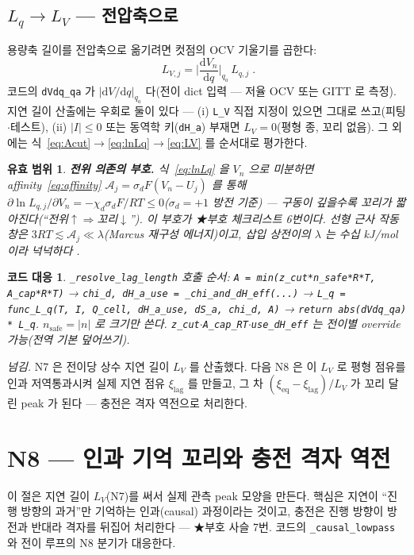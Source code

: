 \documentclass[11pt,a4paper]{article}
\newtheorem*{codebox}{코드 대응}
\newtheorem*{boundbox}{유효 범위}
\newcommand{\dd}{\mathrm{d}}
\newcommand{\eq}{\mathrm{eq}}
\newcommand{\lag}{\mathrm{lag}}
\newcommand{\code}[1]{\texttt{#1}}
\begin{document}
\subsection{$L_q\to L_V$ — 전압축으로}
용량축 길이를 전압축으로 옮기려면 컷점의 OCV 기울기를 곱한다:
\begin{equation}
\boxed{\;L_{V,j}=\Big|\frac{\dd V_n}{\dd q}\Big|_{q_a}\,L_{q,j}\;.}
\label{eq:LV}
\end{equation}
코드의 \code{dVdq\_qa} 가 $|\dd V/\dd q|_{q_a}$ 다(전이 dict 입력 — 저율 OCV 또는 GITT \cite{weppner1977} 로 측정). 지연 길이 산출에는 우회로 둘이 있다 — (i) \code{L\_V} 직접 지정이 있으면 그대로 쓰고(피팅$\cdot$테스트), (ii) $|I|\le0$ 또는 동역학 키(\code{dH\_a}) 부재면 $L_V=0$(평형 종, 꼬리 없음). 그 외에는 식~\eqref{eq:Acut}$\to$\eqref{eq:lnLq}$\to$\eqref{eq:LV} 를 순서대로 평가한다.

\begin{boundbox}
\textbf{전위 의존의 부호.} 식~\eqref{eq:lnLq} 을 $V_n$ 으로 미분하면 affinity~\eqref{eq:affinity} $\mathcal A_j=\sigma_dF(V_n-U_j)$ 를 통해 $\partial\ln L_{q,j}/\partial V_n=-\chi_d\sigma_dF/RT\le0$($\sigma_d=+1$ 방전 기준) — 구동이 깊을수록 꼬리가 짧아진다(``전위$\uparrow\Rightarrow$꼬리$\downarrow$''). 이 부호가 ★부호 체크리스트 6번이다. 선형 근사 작동 창은 $3RT\lesssim\mathcal A_j\ll\lambda$(Marcus 재구성 에너지)이고, 삽입 상전이의 $\lambda$ 는 수십 kJ/mol 이라 넉넉하다 \cite{marcus1956}.
\end{boundbox}

\begin{codebox}
\code{\_resolve\_lag\_length} 호출 순서: \code{A = min(z\_cut*n\_safe*R*T, A\_cap*R*T)} → \code{chi\_d, dH\_a\_use = \_chi\_and\_dH\_eff(...)} → \code{L\_q = func\_L\_q(T, I, Q\_cell, dH\_a\_use, dS\_a, chi\_d, A)} → \code{return abs(dVdq\_qa) * L\_q}. $n_\mathrm{safe}=|n|$ 로 크기만 쓴다. \code{z\_cut}$\cdot$\code{A\_cap\_RT}$\cdot$\code{use\_dH\_eff} 는 전이별 override 가능(전역 기본 덮어쓰기).
\end{codebox}

\medskip
\emph{넘김.} N7 은 전이당 상수 지연 길이 $L_V$ 를 산출했다. 다음 N8 은 이 $L_V$ 로 평형 점유를 인과 저역통과시켜 실제 지연 점유 $\xi_\lag$ 를 만들고, 그 차 $(\xi_\eq-\xi_\lag)/L_V$ 가 꼬리 달린 peak 가 된다 — 충전은 격자 역전으로 처리한다.

\section{N8 — 인과 기억 꼬리와 충전 격자 역전}\label{sec:memory}
이 절은 지연 길이 $L_V$(N7)를 써서 실제 관측 peak 모양을 만든다. 핵심은 지연이 ``진행 방향의 과거''만 기억하는 인과(causal) 과정이라는 것이고, 충전은 진행 방향이 방전과 반대라 격자를 뒤집어 처리한다 — ★부호 사슬 7번. 코드의 \code{\_causal\_lowpass} 와 전이 루프의 N8 분기가 대응한다.
\end{document}
